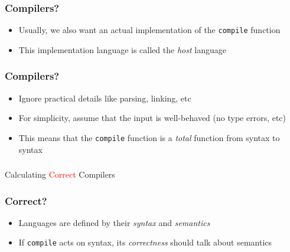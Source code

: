 \documentclass[usenames,dvipsnames]{beamer}
\newcommand{\compile}{\texttt{compile}}
\begin{document}

\begin{frame}
  \frametitle{Compilers?}

  \begin{itemize}
    \item Usually, we also want an actual implementation of the \compile{}
      function

    \item This implementation language is called the \emph{host} language
  \end{itemize}
\end{frame}


\begin{frame}
  \frametitle{Compilers?}

  \begin{itemize}
    \item Ignore practical details like parsing, linking, etc

    \item For simplicity, assume that the input is well-behaved (no type
      errors, etc)

    \item This means that the \compile{} function is a \emph{total} function
      from syntax to syntax
  \end{itemize}
\end{frame}


\begin{frame}
  \frametitle{}

  \begin{center}
    \Huge Calculating \textcolor{red}{Correct} Compilers
  \end{center}
\end{frame}


\begin{frame}
  \frametitle{Correct?}

  \begin{itemize}
    \item Languages are defined by their \emph{syntax} and \emph{semantics}
    \item If \compile{} acts on syntax, its \textit{correctness} should talk
      about semantics
  \end{itemize}
\end{frame}
\end{document}
